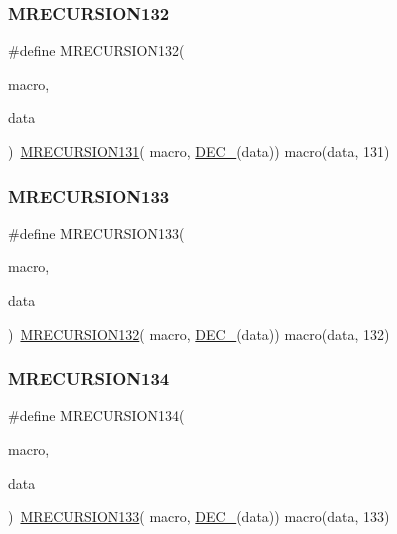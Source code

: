 \subsubsection{\texorpdfstring{MRECURSION132}{MRECURSION132}}
{\footnotesize\ttfamily \#define M\+R\+E\+C\+U\+R\+S\+I\+O\+N132(\begin{DoxyParamCaption}\item[{}]{macro,  }\item[{}]{data }\end{DoxyParamCaption})~\mbox{\hyperlink{group__group__sam0__utils__mrecursion_ga7928b50c50f48c1ee87afe5d3d1897d6}{M\+R\+E\+C\+U\+R\+S\+I\+O\+N131}}(  macro, \mbox{\hyperlink{group__group__sam0__utils__mrecursion_ga1d23d683797679dca8c3512a54a5dcae}{D\+E\+C\+\_\+}}(data))   macro(data, 131)}

\mbox{\label{group__group__sam0__utils__mrecursion_ga8470b5ef07ccf697497fb46ced78884e}} 
\subsubsection{\texorpdfstring{MRECURSION133}{MRECURSION133}}
{\footnotesize\ttfamily \#define M\+R\+E\+C\+U\+R\+S\+I\+O\+N133(\begin{DoxyParamCaption}\item[{}]{macro,  }\item[{}]{data }\end{DoxyParamCaption})~\mbox{\hyperlink{group__group__sam0__utils__mrecursion_ga77488df7e435bb14b20305e9c6c19977}{M\+R\+E\+C\+U\+R\+S\+I\+O\+N132}}(  macro, \mbox{\hyperlink{group__group__sam0__utils__mrecursion_ga1d23d683797679dca8c3512a54a5dcae}{D\+E\+C\+\_\+}}(data))   macro(data, 132)}

\mbox{\label{group__group__sam0__utils__mrecursion_ga340283014fb8ab457e6a67b1549aa8a1}} 
\subsubsection{\texorpdfstring{MRECURSION134}{MRECURSION134}}
{\footnotesize\ttfamily \#define M\+R\+E\+C\+U\+R\+S\+I\+O\+N134(\begin{DoxyParamCaption}\item[{}]{macro,  }\item[{}]{data }\end{DoxyParamCaption})~\mbox{\hyperlink{group__group__sam0__utils__mrecursion_ga8470b5ef07ccf697497fb46ced78884e}{M\+R\+E\+C\+U\+R\+S\+I\+O\+N133}}(  macro, \mbox{\hyperlink{group__group__sam0__utils__mrecursion_ga1d23d683797679dca8c3512a54a5dcae}{D\+E\+C\+\_\+}}(data))   macro(data, 133)}

